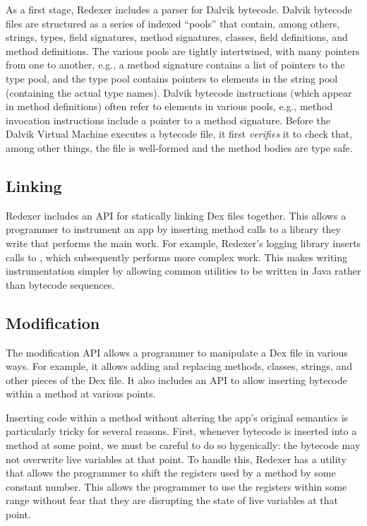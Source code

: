 As a first stage, Redexer includes a parser for Dalvik
bytecode. Dalvik bytecode files are structured as a series of indexed
``pools'' that contain, among others, strings, types, field
signatures, method signatures, classes, field definitions, and method
definitions. The various pools are tightly intertwined, with many
pointers from one to another, e.g., a method signature contains a list
of pointers to the type pool, and the type pool contains pointers to
elements in the string pool (containing the actual type names).
Dalvik bytecode instructions (which appear in method definitions)
often refer to elements in various pools, e.g., method invocation
instructions include a pointer to a method signature.  Before the
Dalvik Virtual Machine executes a bytecode file, it first
\emph{verifies} it to check that, among other things, the file is
well-formed and the method bodies are type safe.

\subsection{Linking}

Redexer includes an API for statically linking Dex files
together. This allows a programmer to instrument an app by inserting
method calls to a library they write that performs the main work. For
example, Redexer's logging library inserts calls to
, which subsequently performs more complex
work. This makes writing instrumentation simpler by allowing common
utilities to be written in Java rather than bytecode sequences.

\subsection{Modification}
\label{sec:modification}

The modification API allows a programmer to manipulate a Dex file in
various ways. For example, it allows adding and replacing methods,
classes, strings, and other pieces of the Dex file. It also includes
an API to allow inserting bytecode within a method at various
points. 

Inserting code within a method without altering the app's original
semantics is particularly tricky for several reasons. First, whenever
bytecode is inserted into a method at some point, we must be careful
to do so hygenically: the bytecode may not overwrite live variables at
that point. To handle this, Redexer has a utility that allows the
programmer to shift the registers used by a method by some constant
number. This allows the programmer to use the registers within some
range without fear that they are disrupting the state of live
variables at that point.

